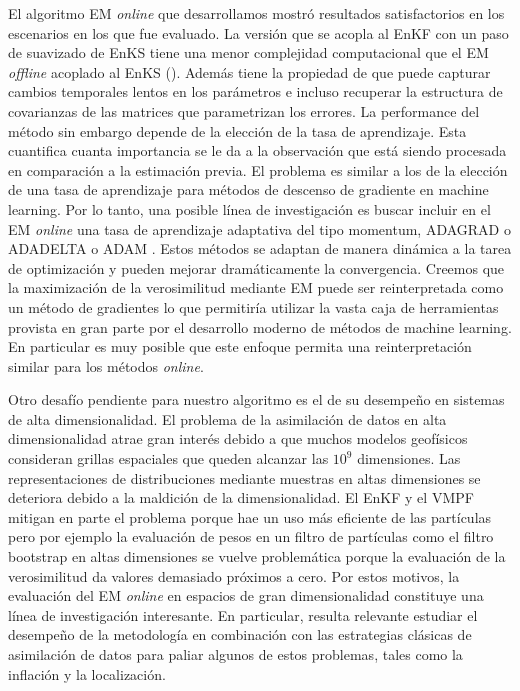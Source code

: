 El algoritmo EM \textit{online} que desarrollamos mostró resultados satisfactorios en los escenarios en los que fue evaluado. La versión que se acopla al EnKF con un paso de suavizado de EnKS tiene una menor complejidad computacional que el EM \textit{offline} acoplado al EnKS (\cite{Pulido2018}). Además tiene la propiedad de que puede capturar cambios temporales lentos en los parámetros e incluso recuperar la estructura de covarianzas de las matrices que parametrizan los errores. La performance del método sin embargo depende de la elección de la tasa de aprendizaje. Esta cuantifica cuanta importancia se le da a la observación que está siendo procesada en comparación a la estimación previa. El problema es similar a los de la elección de una tasa de aprendizaje para métodos de descenso de gradiente en machine learning. Por lo tanto, una posible línea de investigación es buscar incluir en el EM \textit{online} una tasa de aprendizaje adaptativa del tipo momentum, ADAGRAD o ADADELTA \citep{Zeiler2012} o ADAM \citep{Kingma2014}. Estos métodos se adaptan de manera dinámica a la tarea de optimización y pueden mejorar dramáticamente la convergencia. Creemos que la maximización de la verosimilitud mediante EM puede ser reinterpretada como un método de gradientes lo que permitiría utilizar la vasta caja de herramientas provista en gran parte por el desarrollo moderno de métodos de machine learning. En particular es muy posible que este enfoque permita una reinterpretación similar para los métodos \textit{online}.

Otro desafío pendiente para nuestro algoritmo es el de su desempeño en sistemas de alta dimensionalidad. El problema de la asimilación de datos en alta dimensionalidad atrae gran interés debido a que muchos modelos geofísicos consideran grillas espaciales que queden alcanzar las $10^9$ dimensiones. Las representaciones de distribuciones mediante muestras en altas dimensiones se deteriora debido a la maldición de la dimensionalidad. El EnKF y el VMPF mitigan en parte el problema porque hae un uso más eficiente de las partículas pero por ejemplo la evaluación de pesos en un filtro de partículas como el filtro bootstrap en altas dimensiones se vuelve problemática porque la evaluación de la verosimilitud da valores demasiado próximos a cero. Por estos motivos, la evaluación del EM \textit{online} en espacios de gran dimensionalidad constituye una línea de investigación interesante. En particular, resulta relevante estudiar el desempeño de la metodología en combinación con las estrategias clásicas de asimilación de datos para paliar algunos de estos problemas, tales como la inflación y la localización.

